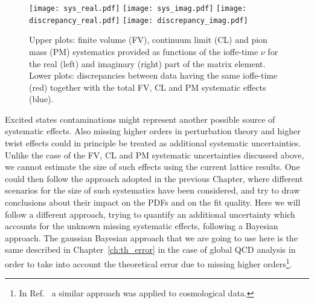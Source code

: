 \begin{figure}[h!]
    \centering
    \texttt{[image: sys\_real.pdf]}  
    \texttt{[image: sys\_imag.pdf]}
    \texttt{[image: discrepancy\_real.pdf]}  
    \texttt{[image: discrepancy\_imag.pdf]}
\caption{Upper plots: finite volume (FV), continuum limit (CL) and pion mass (PM) systematics provided 
as functions of the ioffe-time $\nu$ for the real (left) and imaginary (right) part 
of the matrix element. Lower plots: discrepancies between data having the same ioffe-time (red)
together with the total FV, CL and PM systematic effects (blue).}
\label{fig:sys}
\end{figure}

%
Excited states contaminations might represent another possible source of systematic effects. 
Also missing higher orders in perturbation theory and higher twist effects could in principle be treated
as additional systematic uncertainties. 
Unlike the case of the FV, CL and PM systematic uncertainties discussed above, we cannot estimate
the size of such effects using the current lattice results. 
One could then follow the approach adopted in the previous Chapter,
where different scenarios for the size of such systematics have been considered, and try to draw conclusions about their
impact on the PDFs and on the fit quality. 
Here we will follow a different approach, trying to quantify an additional uncertainty which accounts for the 
unknown missing systematic effects, following a Bayesian approach.
The gaussian Bayesian approach that we are going to use here is the same 
described in Chapter~\ref{ch:th_error} in the case of global QCD analysis in order to take into account 
the theoretical error due to missing higher orders\footnote{In Ref.~\cite{Bernal:2018cxc} a similar approach was applied 
to cosmological data.}.

